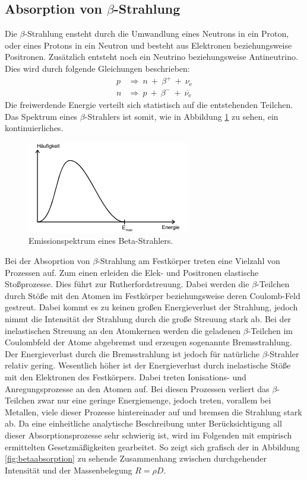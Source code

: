 \subsection{Absorption von \texorpdfstring{$\beta$}{beta}-Strahlung}
Die $\beta$-Strahlung ensteht durch die Umwandlung eines Neutrons in ein Proton, oder eines Protons in ein Neutron und besteht aus Elektronen beziehungsweise Positronen.
Zusätzlich entsteht noch ein Neutrino beziehungsweise Antineutrino.
Dies wird durch folgende Gleichungen beschrieben:
\begin{align*}
  p & \Rightarrow \: n \: + \: {\beta}^{+} \: + \: \nu_\text{e} \\
  n & \Rightarrow \: p \: + \: {\beta}^{-} \: + \: \overline{\nu_\text{e}}
\end{align*}
Die freiwerdende Energie verteilt sich statistisch auf die entstehenden Teilchen.
Das Spektrum eines $\beta$-Strahlers ist somit, wie in Abbildung \ref{fig:betaspektrum}
zu sehen, ein kontinuierliches.
\begin{figure}
  \centering
  \includegraphics{pictures/betaspektrum.png}
  \caption{Emissionspektrum eines Beta-Strahlers.\cite{sample}}
  \label{fig:betaspektrum}
\end{figure}
Bei der Absoprtion von $\beta$-Strahlung am Festkörper treten eine Vielzahl von Prozessen auf.
Zum einen erleiden die Elek- und Positronen elastische Stoßprozesse. Dies führt zur Rutherfordstreuung.
Dabei werden die $\beta$-Teilchen durch Stöße mit den Atomen im Festkörper beziehungsweise deren Coulomb-Feld gestreut. Dabei kommt es zu keinen großen Energieverlust der Strahlung,
jedoch nimmt die Intensität der Strahlung durch die große Streuung stark ab.
Bei der inelastischen Streuung an den Atomkernen werden die geladenen $\beta$-Teilchen im Coulombfeld der Atome abgebremst und erzeugen sogenannte Bremsstrahlung.
Der Energieverlust durch die Bremsstrahlung ist jedoch für natürliche $\beta$-Strahler relativ gering.
Wesentlich höher ist der Energieverlust durch inelastische Stöße mit den Elektronen des Festkörpers. Dabei treten Ionisations- und Anregungsprozesse an den Atomen auf.
Bei diesen Prozessen verliert das $\beta$-Teilchen zwar nur eine geringe Energiemenge, jedoch treten, vorallem bei Metallen, viele dieser Prozesse hintereinader auf und
bremsen die Strahlung stark ab. Da eine einheitliche analytische Beschreibung unter Berücksichtigung all dieser Absorptionsprozesse sehr schwierig ist, wird im Folgenden
mit empirisch ermittelten Gesetzmäßigkeiten gearbeitet. So zeigt sich grafisch der in Abbildung \ref{fig:betaabsorption} zu sehende Zusammenhang zwischen durchgehender Intensität
und der Massenbelegung $R=\rho D$.

